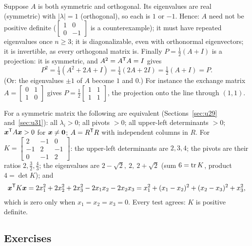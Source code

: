 \begin{example}\label{ex:u37-symorth}
Suppose $A$ is both symmetric and orthogonal. Its eigenvalues are real (symmetric) with $|\lambda|=1$ (orthogonal), so each is $1$ or $-1$. Hence: $A$ need not be positive definite ($\begin{bmatrix}1&0\\0&-1\end{bmatrix}$ is a counterexample); it must have repeated eigenvalues once $n\ge3$; it is diagonalizable, even with orthonormal eigenvectors; it is invertible, as every orthogonal matrix is. Finally $P=\tfrac12(A+I)$ is a projection: it is symmetric, and $A^{2}=A^{\mathsf{T}} A=I$ gives
\[
P^{2}=\tfrac14(A^{2}+2A+I)=\tfrac14(2A+2I)=\tfrac12(A+I)=P.
\]
(Or: the eigenvalues $\pm1$ of $A$ become $1$ and $0$.) For instance the exchange matrix $A=\begin{bmatrix}0&1\\1&0\end{bmatrix}$ gives $P=\tfrac12\begin{bmatrix}1&1\\1&1\end{bmatrix}$, the projection onto the line through $(1,1)$.
\end{example}

\begin{example}\label{ex:u37-pd}
For a symmetric matrix the following are equivalent (Sections~\ref{sec:u29} and~\ref{sec:u31}): all $\lambda_i>0$; all pivots $>0$; all upper-left determinants $>0$; $\boldsymbol{x}^{\mathsf{T}} A\boldsymbol{x}>0$ for $\boldsymbol{x}\neq\boldsymbol{0}$; $A=R^{\mathsf{T}} R$ with independent columns in $R$. For
$K=\begin{bmatrix}2&-1&0\\-1&2&-1\\0&-1&2\end{bmatrix}$:
the upper-left determinants are $2,3,4$; the pivots are their ratios $2,\tfrac32,\tfrac43$; the eigenvalues are $2-\sqrt2,\ 2,\ 2+\sqrt2$ (sum $6=\operatorname{tr} K$, product $4=\det K$); and
\[
\boldsymbol{x}^{\mathsf{T}} K\boldsymbol{x}=2x_1^{2}+2x_2^{2}+2x_3^{2}-2x_1x_2-2x_2x_3=x_1^{2}+(x_1-x_2)^{2}+(x_2-x_3)^{2}+x_3^{2},
\]
which is zero only when $x_1=x_2=x_3=0$. Every test agrees: $K$ is positive definite.
\end{example}

\subsection{Exercises}

